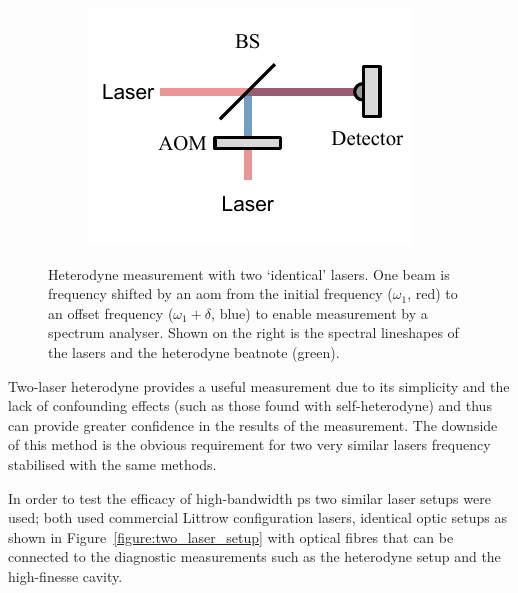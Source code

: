 \begin{figure}
    \begin{subfigure}{0.49\linewidth}
    \includegraphics{part1/Figs/HeterodyneTwoLasers.pdf}
    \end{subfigure}
    \begin{subfigure}{0.49\linewidth}
    
    \end{subfigure}
    \caption[Heterodyne measurement with a two `identical' lasers.]{Heterodyne measurement with two `identical' lasers. One beam is frequency shifted by an \gls{aom} from the initial frequency ($\omega_1$, red) to an offset frequency ($\omega_1+\delta$, blue) to enable measurement by a spectrum analyser. Shown on the right is the spectral lineshapes of the lasers and the heterodyne beatnote (green).}
    \label{figure:two-laser_heterodyne}
\end{figure}

Two-laser heterodyne provides a useful measurement due to its simplicity and the lack of confounding effects (such as those found with self-heterodyne) and thus can provide greater confidence in the results of the measurement.
The downside of this method is the obvious requirement for two very similar lasers frequency stabilised with the same methods.

In order to test the efficacy of high-bandwidth \gls{ps} two similar laser setups were used; both used commercial Littrow configuration lasers, identical optic setups as shown in Figure~\ref{figure:two_laser_setup} with optical fibres that can be connected to the diagnostic measurements such as the heterodyne setup and the high-finesse cavity.

